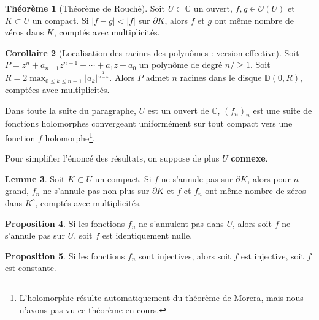 \documentclass[11pt,a4paper]{article}
\newcommand{\D}{\mathbb{D}}
\newcommand{\C}{\mathbb{C}}
\theoremstyle{definition}
\newtheorem{theoreme}{Th\'eor\`eme}[section]
\newtheorem{proposition}[theoreme]{Proposition}
\newtheorem{corollaire}[theoreme]{Corollaire}
\newtheorem{lemme}[theoreme]{Lemme}
\theoremstyle{plain}
\begin{document}

\begin{theoreme}[Théorème de Rouché]
Soit $U\subset \C$ un ouvert, $f, g\in \mathcal O(U)$ et $K\subset U$ un compact.
Si $|f-g| < |f|$ sur $\partial K$, alors $f$ et $g$ ont même nombre de zéros dans $K$, comptés avec multiplicités.
\end{theoreme}




\begin{corollaire}[Localisation des racines des polynômes : version effective]
Soit $P=z^n + a_{n-1}z^{n-1}+\cdots + a_1z + a_0$ un polynôme de degré $n/\geq 1$.
Soit $R  = 2\max_{0\leq k\leq n-1} |a_k|^{\frac{1}{n-k}}$.
Alors $P$ admet $n$ racines dans le disque $\D(0,R)$, comptées avec multiplicités.
\end{corollaire}


Dans toute la suite du paragraphe, $U$ est un ouvert de $\C$, $(f_n)_n$ est une suite de fonctions holomorphes convergeant uniformément sur tout compact vers une fonction $f$ holomorphe\footnote{L'holomorphie résulte automatiquement du théorème de Morera, mais nous n'avons pas vu ce théorème en cours.}.

Pour simplifier l'énoncé des résultats, on suppose de plus $U$ \textbf{connexe}.

\begin{lemme}
Soit $K \subset U$ un compact. Si $f$ ne s'annule pas sur $\partial K$, alors pour $n$ grand, $f_n$ ne s'annule pas non plus sur $\partial K$ et $f$ et $f_n$ ont même nombre de zéros dans $K^\circ$, comptés avec multiplicités.
\end{lemme}

\begin{proposition}
Si les fonctions $f_n$ ne s'annulent pas dans $U$, alors soit $f$ ne s'annule pas sur $U$, soit $f$ est identiquement nulle.
\end{proposition}

\begin{proposition}
Si les fonctions $f_n$ sont injectives, alors soit $f$ est injective, soit $f$ est constante.
\end{proposition}
\end{document}
